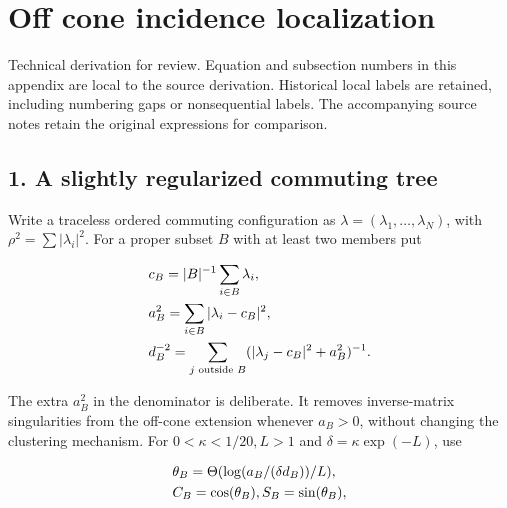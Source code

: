 \clearpage
\section{Off cone incidence
localization}\label{j-off-cone-incidence-localization}

Technical derivation for review. Equation and subsection numbers in this
appendix are local to the source derivation. Historical local labels are
retained, including numbering gaps or nonsequential labels. The
accompanying source notes retain the original expressions for
comparison.

\subsection{1. A slightly regularized commuting
tree}\label{j-a-slightly-regularized-commuting-tree}

Write a traceless ordered commuting configuration as
\(\lambda =(\lambda _{1},\ldots ,\lambda _{N})\), with
\(\rho ^{2}=\sum  \vert \lambda _{i}\vert ^{2}\). For a proper subset
\(B\) with at least two members put

\begin{gather*}
\begin{aligned}
& c_{B}=\vert B\vert ^{-1} \sum _{i \in  B} \lambda _{i}, \\
& a_{B}^{2}=\sum _{i \in  B}\vert \lambda _{i}-c_{B}\vert ^{2}, \\
& d_{B}^{-2}=\sum _{j \text{ outside } B} (\vert \lambda _{j}-c_{B}\vert ^{2}+a_{B}^{2})^{-1}.
\end{aligned}\notag
\end{gather*}

The extra \(a_{B}^{2}\) in the denominator is deliberate. It removes
inverse-matrix singularities from the off-cone extension whenever
\(a_{B}>0\), without changing the clustering mechanism. For
\(0<\kappa <1/20, L>1\) and \(\delta =\kappa  \exp (-L)\), use

\begin{gather*}
\begin{aligned}
& \theta _{B}=\Theta (\log (a_{B}/(\delta  d_{B}))/L), \\
& C_{B}=\cos (\theta _{B}), S_{B}=\sin (\theta _{B}),
\end{aligned}\notag
\end{gather*}


